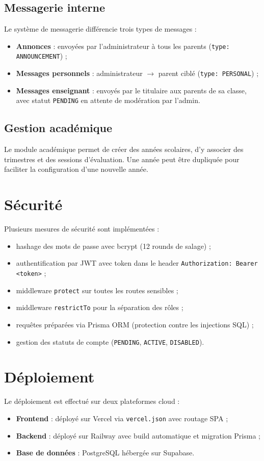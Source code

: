 \documentclass[12pt, a4paper]{report}
\begin{document}
\subsection{Messagerie interne}
Le système de messagerie différencie trois types de messages :
\begin{itemize}[noitemsep]
    \item \textbf{Annonces} : envoyées par l'administrateur à tous les parents (\texttt{type: ANNOUNCEMENT}) ;
    \item \textbf{Messages personnels} : administrateur $\rightarrow$ parent ciblé (\texttt{type: PERSONAL}) ;
    \item \textbf{Messages enseignant} : envoyés par le titulaire aux parents de sa classe, avec statut \texttt{PENDING} en attente de modération par l'admin.
\end{itemize}

\subsection{Gestion académique}
Le module académique permet de créer des années scolaires, d'y associer des trimestres et des sessions d'évaluation. Une année peut être dupliquée pour faciliter la configuration d'une nouvelle année.

\section{Sécurité}
Plusieurs mesures de sécurité sont implémentées :
\begin{itemize}[noitemsep]
    \item hashage des mots de passe avec bcrypt (12 rounds de salage) ;
    \item authentification par JWT avec token dans le header \texttt{Authorization: Bearer <token>} ;
    \item middleware \texttt{protect} sur toutes les routes sensibles ;
    \item middleware \texttt{restrictTo} pour la séparation des rôles ;
    \item requêtes préparées via Prisma ORM (protection contre les injections SQL) ;
    \item gestion des statuts de compte (\texttt{PENDING}, \texttt{ACTIVE}, \texttt{DISABLED}).
\end{itemize}

\section{Déploiement}
Le déploiement est effectué sur deux plateformes cloud :
\begin{itemize}[noitemsep]
    \item \textbf{Frontend} : déployé sur Vercel via \texttt{vercel.json} avec routage SPA ;
    \item \textbf{Backend} : déployé sur Railway avec build automatique et migration Prisma ;
    \item \textbf{Base de données} : PostgreSQL hébergée sur Supabase.
\end{itemize}
\end{document}
